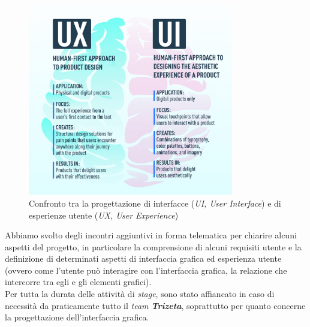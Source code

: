 \begin{figure}[H]
    \centering
    \includegraphics[width=0.8\textwidth]{images/difference-between-ux-and-ui.jpg}
    \caption[Confronto tra la progettazione di interfacce e di esperienze utente]{Confronto tra la progettazione di interfacce (\textit{UI, User Interface}) e di esperienze utente (\textit{UX, User Experience})\footnotemark}
\end{figure}
Abbiamo svolto degli incontri aggiuntivi in forma telematica per chiarire alcuni aspetti del progetto, in particolare la comprensione di alcuni requisiti utente e la definizione di determinati aspetti
di interfaccia grafica ed esperienza utente (ovvero come l'utente può interagire con l'interfaccia grafica, la relazione che intercorre tra egli e gli elementi grafici). \\
Per tutta la durata delle attività di \textit{stage}, sono stato affiancato in caso di necessità da praticamente tutto il \textit{team \textbf{Trizeta}}, soprattutto per quanto concerne la progettazione dell'interfaccia grafica.



